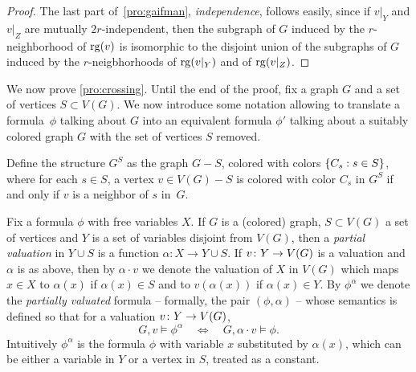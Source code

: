 \begin{proof}
The last part of~\cref{pro:gaifman}, \emph{independence}, follows easily, since if $v|_Y$ and $v|_Z$ are mutually $2r$-independent, then the subgraph of $G$ induced by the $r$-neighborhood of $\mathrm{rg}(v)$ is isomorphic to the disjoint union of the subgraphs of $G$ induced by the $r$-neigbhorhoods of $\mathrm{rg}(v|_Y)$
and of $\mathrm{rg}(v|_Z)$.
\end{proof}

\medskip
We now prove \cref{pro:crossing}. Until the end of the proof, fix a graph $G$ and a set of vertices $S\subset V(G)$.
We now introduce some notation allowing to translate a  formula~$\phi$ talking about  $G$ into an equivalent formula $\phi'$ talking 
about a suitably colored  graph $G$ with the set of vertices $S$ removed.

Define the structure $G^{S}$
as the graph $G-S$, colored with colors $\{C_s: s\in S\}$,
where for each $s\in S$, a vertex $v\in V(G)-S$
is colored with color $C_s$ in $G^S$ if and only if $v$ is a neighbor of $s$
in~$G$.

Fix a formula $\phi$ with free variables $X$.
If $G$ is a (colored) graph, $S\subset V(G)$ a set of vertices and $Y$ is a set of variables disjoint from $V(G)$, then 
a \emph{partial valuation} in $Y\cup S$ is a 
function $\alpha\colon X\to Y\cup S$.
If $v\colon Y\to V(G)$ is a valuation and $\alpha$ is as above,
then by $\alpha\cdot v$ we denote the valuation of $X$ in $V(G)$
which maps $x\in X$ to $\alpha(x) $ if $\alpha(x)\in S$
and to $v(\alpha(x))$ if $\alpha(x)\in Y$.
By $\phi^{\alpha}$ we denote the \emph{partially valuated} formula -- formally, the pair $(\phi,\alpha)$ -- whose semantics is defined so that for a valuation $v\colon Y\to V(G)$, 
$$G,v\models \phi^{\alpha}\quad\Leftrightarrow \quad G,\alpha\cdot v\models \phi.$$
Intuitively $\phi^\alpha$ is the formula $\phi$ with variable $x$ substituted by $\alpha(x)$,
which can be either a variable in $Y$ or a vertex in $S$, treated as a constant.


